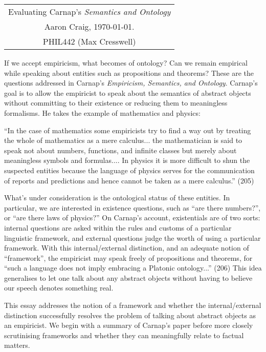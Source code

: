 \documentclass[12pt]{article}
\begin{document}
\begin{center}
\begin{tabular}{c}
\large Evaluating Carnap's \textit{Semantics and Ontology} \\
Aaron Craig, \today. \\
PHIL442 (Max Cresswell) \\



\end{tabular}
\end{center}

\noindent
If we accept empiricism, what becomes of ontology? Can we remain empirical while speaking about entities such as propositions and theorems? These are the questions addressed in Carnap's \textit{Empiricism, Semantics, and Ontology}. Carnap's goal is to allow the empiricist to speak about the semantics of abstract objects without committing to their existence or reducing them to meaningless formalisms. He takes the example of mathematics and physics:

\begin{displayquote}
``In the case of mathematics some empiricists try to find a way out by treating the whole of mathematics as a mere calculus... the mathematician is said to speak not about numbers, functions, and infinite classes but merely about meaningless symbols and formulas.... In physics it is more difficult to shun the suspected entities because the language of physics serves for the communication of reports and predictions and hence cannot be taken as a mere calculus.'' (205)
\end{displayquote}

What's under consideration is the ontological status of these entities. In particular, we are interested in existence questions, such as ``are there numbers?'', or ``are there laws of physics?'' On Carnap's account, existentials are of two sorts: internal questions are asked within the rules and customs of a particular linguistic framework, and external questions judge the worth of using a particular framework. With this internal/external distinction, and an adequate notion of ``framework'', the empiricist may speak freely of propositions and theorems, for ``such a language does not imply embracing a Platonic ontology...'' (206) This idea generalises to let one talk about any abstract objects without having to believe our speech denotes something real.

This essay addresses the notion of a framework and whether the internal/external distinction successfully resolves the problem of talking about abstract objects as an empiricist. We begin with a summary of Carnap's paper before more closely scrutinising frameworks and whether they can meaningfully relate to factual matters.
\end{document}
